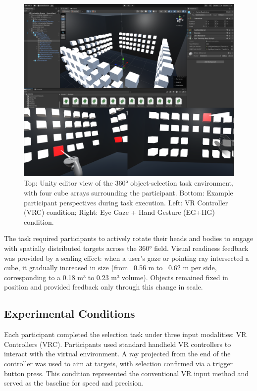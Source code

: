 \documentclass[utf8]{FrontiersinHarvard} %
\begin{document}
\begin{figure}[ht]
\begin{center}
\includegraphics[width=15cm]{figures/unity.png}
\end{center}
\caption{Top: Unity editor view of the 360° object-selection task environment, with four cube arrays surrounding the participant. Bottom: Example participant perspectives during task execution. Left: VR Controller (VRC) condition; Right: Eye Gaze + Hand Gesture (EG+HG) condition.}
\label{fig:unity}
\end{figure}

The task required participants to actively rotate their heads and bodies to engage with spatially distributed targets across the 360° field. Visual readiness feedback was provided by a scaling effect: when a user's gaze or pointing ray intersected a cube, it gradually increased in size (from ~0.56 m to ~0.62 m per side, corresponding to a 0.18 m³ to 0.23 m³ volume). Objects remained fixed in position and provided feedback only through this change in scale.


\subsection{Experimental Conditions}
Each participant completed the selection task under three input modalities:
VR Controllers (VRC). Participants used standard handheld VR controllers to interact with the virtual environment. A ray projected from the end of the controller was used to aim at targets, with selection confirmed via a trigger button press. This condition represented the conventional VR input method and served as the baseline for speed and precision.
\end{document}
